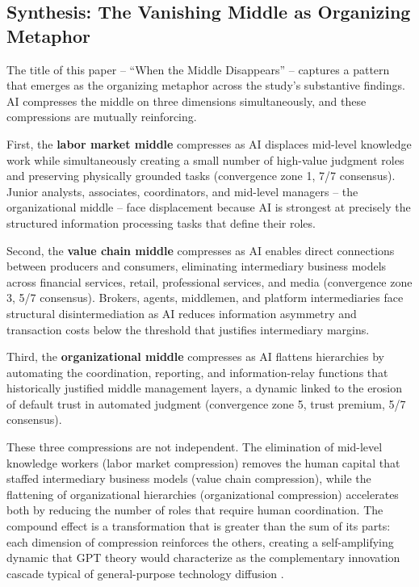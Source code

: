 \documentclass[preprint,review,12pt]{elsarticle}
\begin{document}
\subsection{Synthesis: The Vanishing Middle as Organizing Metaphor}
\label{sec:vanishing_middle}

The title of this paper -- ``When the Middle Disappears'' -- captures a pattern that emerges as the organizing metaphor across the study's substantive findings. AI compresses the middle on three dimensions simultaneously, and these compressions are mutually reinforcing.

First, the \textbf{labor market middle} compresses as AI displaces mid-level knowledge work while simultaneously creating a small number of high-value judgment roles and preserving physically grounded tasks (convergence zone 1, 7/7 consensus). Junior analysts, associates, coordinators, and mid-level managers -- the organizational middle -- face displacement because AI is strongest at precisely the structured information processing tasks that define their roles.

Second, the \textbf{value chain middle} compresses as AI enables direct connections between producers and consumers, eliminating intermediary business models across financial services, retail, professional services, and media (convergence zone 3, 5/7 consensus). Brokers, agents, middlemen, and platform intermediaries face structural disintermediation as AI reduces information asymmetry and transaction costs below the threshold that justifies intermediary margins.

Third, the \textbf{organizational middle} compresses as AI flattens hierarchies by automating the coordination, reporting, and information-relay functions that historically justified middle management layers, a dynamic linked to the erosion of default trust in automated judgment (convergence zone 5, trust premium, 5/7 consensus).

These three compressions are not independent. The elimination of mid-level knowledge workers (labor market compression) removes the human capital that staffed intermediary business models (value chain compression), while the flattening of organizational hierarchies (organizational compression) accelerates both by reducing the number of roles that require human coordination. The compound effect is a transformation that is greater than the sum of its parts: each dimension of compression reinforces the others, creating a self-amplifying dynamic that GPT theory would characterize as the complementary innovation cascade typical of general-purpose technology diffusion \citep{bresnahan1995gpt, helpman1998gpt}.
\end{document}
